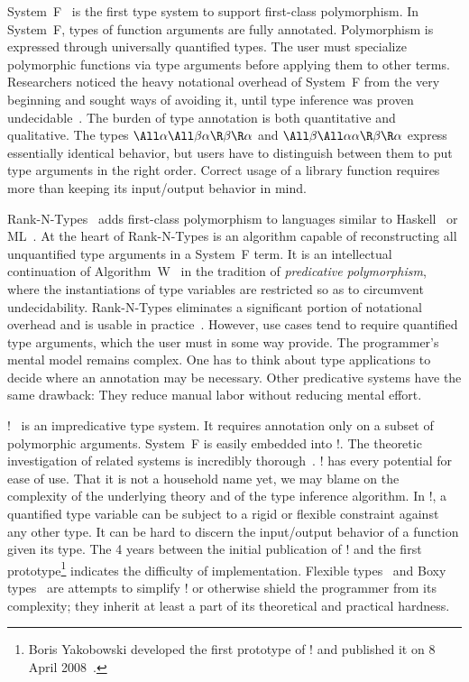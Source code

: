 \documentclass{amsart}
\begin{document}
System~F~\cite{Reynolds74} is the first type system to support
first-class polymorphism. In System~F, types of function
arguments are fully annotated. Polymorphism is expressed through
universally quantified types. The user must specialize
polymorphic functions via type arguments before applying them to
other terms. Researchers noticed the heavy notational overhead of
System~F from the very beginning and sought ways of avoiding it,
until type inference was proven
undecidable~\cite{Schubert98,Wells96}. The burden of type
annotation is both quantitative and qualitative. The types
$\All\alpha\All\beta\alpha\R\beta\R\alpha$ and
$\All\beta\All\alpha\alpha\R\beta\R\alpha$ express essentially
identical behavior, but users have to distinguish between them to
put type arguments in the right order. Correct usage of a library
function requires more than keeping its input/output behavior in
mind.

Rank-N-Types~\cite{Jones07} adds first-class polymorphism to
languages similar to Haskell~\cite{Marlow10} or
ML~\cite{Milner97}. At the heart of Rank-N-Types is an algorithm
capable of reconstructing all unquantified type arguments in a
System~F term. It is an intellectual continuation of
Algorithm~W~\cite{Milner78} in the tradition of \emph{predicative
polymorphism}, where the instantiations of type variables are
restricted so as to circumvent undecidability. Rank-N-Types
eliminates a significant portion of notational overhead and is
usable in
practice~\cite{Kiselyov13,Laemmel03,Launchbury94,Washburn03}.
However, use cases tend to require quantified type arguments,
which the user must in some way provide. The programmer's mental
model remains complex. One has to think about type applications
to decide where an annotation may be necessary. Other predicative
systems have the same drawback: They reduce manual labor without
reducing mental effort.

\MLF!~\cite{LeBotlan03,RemyMLF} is an impredicative type system.
It requires annotation only on a subset of polymorphic arguments.
System~F is easily embedded into \MLF!. The theoretic
investigation of related systems is incredibly
thorough~\cite{RemyMLF}. \MLF! has every potential for ease of
use. That it is not a household name yet, we may blame on the
complexity of the underlying theory and of the type inference
algorithm. In \MLF!, a quantified type variable can be subject to
a rigid or flexible constraint against any other type. It can be
hard to discern the input/output behavior of a function given its
type. The 4 years between the initial publication of \MLF! and
the first prototype\footnote{ Boris Yakobowski developed the
first prototype of \MLF! and published it on 8 April
2008~\cite{RemyMLF}. } indicates the difficulty of
implementation. Flexible types~\cite{Leijen09} and Boxy
types~\cite{Vytiniotis06} are attempts to simplify \MLF! or
otherwise shield the programmer from its complexity; they inherit
at least a part of its theoretical and practical hardness.
\end{document}
